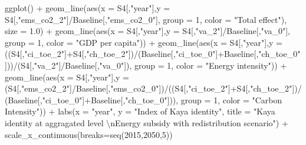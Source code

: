 \documentclass[
]{article}
\newenvironment{Shaded}{\begin{snugshade}}{\end{snugshade}}
\newcommand{\AttributeTok}[1]{\textcolor[rgb]{0.77,0.63,0.00}{#1}}
\newcommand{\DecValTok}[1]{\textcolor[rgb]{0.00,0.00,0.81}{#1}}
\newcommand{\FloatTok}[1]{\textcolor[rgb]{0.00,0.00,0.81}{#1}}
\newcommand{\FunctionTok}[1]{\textcolor[rgb]{0.00,0.00,0.00}{#1}}
\newcommand{\NormalTok}[1]{#1}
\newcommand{\SpecialCharTok}[1]{\textcolor[rgb]{0.00,0.00,0.00}{#1}}
\newcommand{\StringTok}[1]{\textcolor[rgb]{0.31,0.60,0.02}{#1}}
\begin{document}
\begin{Shaded}
\begin{Highlighting}[]
\FunctionTok{ggplot}\NormalTok{() }\SpecialCharTok{+} 
  \FunctionTok{geom\_line}\NormalTok{(}\FunctionTok{aes}\NormalTok{(}\AttributeTok{x =}\NormalTok{ S4[,}\StringTok{"year"}\NormalTok{],}\AttributeTok{y =}\NormalTok{ S4[,}\StringTok{"ems\_co2\_2"}\NormalTok{]}\SpecialCharTok{/}\NormalTok{Baseline[,}\StringTok{"ems\_co2\_0"}\NormalTok{], }\AttributeTok{group =} \DecValTok{1}\NormalTok{, }\AttributeTok{color =} \StringTok{"Total effect"}\NormalTok{), }\AttributeTok{size =} \FloatTok{1.0}\NormalTok{) }\SpecialCharTok{+} 
  \FunctionTok{geom\_line}\NormalTok{(}\FunctionTok{aes}\NormalTok{(}\AttributeTok{x =}\NormalTok{ S4[,}\StringTok{"year"}\NormalTok{],}\AttributeTok{y =}\NormalTok{ S4[,}\StringTok{"va\_2"}\NormalTok{]}\SpecialCharTok{/}\NormalTok{Baseline[,}\StringTok{"va\_0"}\NormalTok{], }\AttributeTok{group =} \DecValTok{1}\NormalTok{, }\AttributeTok{color =} \StringTok{"GDP per capita"}\NormalTok{)) }\SpecialCharTok{+} 
  \FunctionTok{geom\_line}\NormalTok{(}\FunctionTok{aes}\NormalTok{(}\AttributeTok{x =}\NormalTok{ S4[,}\StringTok{"year"}\NormalTok{],}\AttributeTok{y =}\NormalTok{ ((S4[,}\StringTok{"ci\_toe\_2"}\NormalTok{]}\SpecialCharTok{+}\NormalTok{S4[,}\StringTok{"ch\_toe\_2"}\NormalTok{])}\SpecialCharTok{/}\NormalTok{(Baseline[,}\StringTok{"ci\_toe\_0"}\NormalTok{]}\SpecialCharTok{+}\NormalTok{Baseline[,}\StringTok{"ch\_toe\_0"}\NormalTok{]))}\SpecialCharTok{/}\NormalTok{(S4[,}\StringTok{"va\_2"}\NormalTok{]}\SpecialCharTok{/}\NormalTok{Baseline[,}\StringTok{"va\_0"}\NormalTok{]), }\AttributeTok{group =} \DecValTok{1}\NormalTok{, }\AttributeTok{color =} \StringTok{"Energy intensity"}\NormalTok{)) }\SpecialCharTok{+} 
  \FunctionTok{geom\_line}\NormalTok{(}\FunctionTok{aes}\NormalTok{(}\AttributeTok{x =}\NormalTok{ S4[,}\StringTok{"year"}\NormalTok{],}\AttributeTok{y =}\NormalTok{  (S4[,}\StringTok{"ems\_co2\_2"}\NormalTok{]}\SpecialCharTok{/}\NormalTok{Baseline[,}\StringTok{"ems\_co2\_0"}\NormalTok{])}\SpecialCharTok{/}\NormalTok{((S4[,}\StringTok{"ci\_toe\_2"}\NormalTok{]}\SpecialCharTok{+}\NormalTok{S4[,}\StringTok{"ch\_toe\_2"}\NormalTok{])}\SpecialCharTok{/}\NormalTok{(Baseline[,}\StringTok{"ci\_toe\_0"}\NormalTok{]}\SpecialCharTok{+}\NormalTok{Baseline[,}\StringTok{"ch\_toe\_0"}\NormalTok{])), }\AttributeTok{group =} \DecValTok{1}\NormalTok{, }\AttributeTok{color =} \StringTok{"Carbon Intensity"}\NormalTok{)) }\SpecialCharTok{+} 
  \FunctionTok{labs}\NormalTok{(}\AttributeTok{x =} \StringTok{"year"}\NormalTok{, }\AttributeTok{y =} \StringTok{"Index of Kaya identity"}\NormalTok{, }\AttributeTok{title =} \StringTok{"Kaya identity at aggragated level }\SpecialCharTok{\textbackslash{}n}\StringTok{Energy subsidy with redistribution scenario"}\NormalTok{) }\SpecialCharTok{+}
  \FunctionTok{scale\_x\_continuous}\NormalTok{(}\AttributeTok{breaks=}\FunctionTok{seq}\NormalTok{(}\DecValTok{2015}\NormalTok{,}\DecValTok{2050}\NormalTok{,}\DecValTok{5}\NormalTok{))}
\end{Highlighting}
\end{Shaded}
\end{document}
